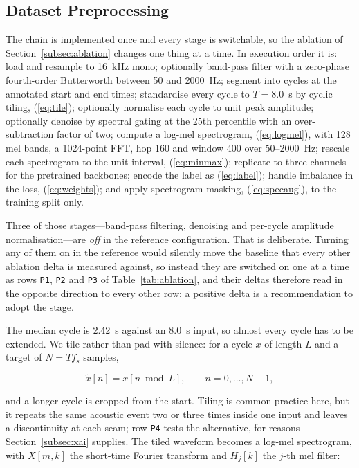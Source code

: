 \documentclass[journal,onecolumn]{IEEEtran}
\begin{document}
\subsection{Dataset Preprocessing}
\label{subsec:preprocessing}

The chain is implemented once and every stage is switchable, so the ablation of
Section~\ref{subsec:ablation} changes one thing at a time. In execution order it is: load and
resample to 16~kHz mono; optionally band-pass filter with a zero-phase fourth-order Butterworth
between 50 and 2000~Hz; segment into cycles at the annotated start and end times; standardise
every cycle to $T = 8.0$~s by cyclic tiling, (\ref{eq:tile}); optionally normalise each cycle
to unit peak amplitude; optionally denoise by spectral gating at the 25th percentile with an
over-subtraction factor of two; compute a log-mel spectrogram, (\ref{eq:logmel}), with 128 mel
bands, a 1024-point FFT, hop 160 and window 400 over 50--2000~Hz; rescale each spectrogram to
the unit interval, (\ref{eq:minmax}); replicate to three channels for the pretrained backbones;
encode the label as (\ref{eq:label}); handle imbalance in the loss, (\ref{eq:weights}); and
apply spectrogram masking, (\ref{eq:specaug}), to the training split only.

Three of those stages---band-pass filtering, denoising and per-cycle amplitude
normalisation---are \emph{off} in the reference configuration. That is deliberate. Turning
any of them on in the reference would silently move the baseline that every other ablation
delta is measured against, so instead they are switched on one at a time as rows
\texttt{P1}, \texttt{P2} and \texttt{P3} of Table~\ref{tab:ablation}, and their deltas
therefore read in the opposite direction to every other row: a positive delta is a
recommendation to adopt the stage.

The median cycle is 2.42~s against an 8.0~s input, so almost every cycle has to be extended.
We tile rather than pad with silence: for a cycle $x$ of length $L$ and a target of
$N = T f_s$ samples,

\begin{equation}
\tilde{x}[n] = x[n \bmod L], \qquad n = 0,\dots,N-1,
\label{eq:tile}
\end{equation}

and a longer cycle is cropped from the start. Tiling is common practice here, but it repeats
the same acoustic event two or three times inside one input and leaves a discontinuity at each
seam; row \texttt{P4} tests the alternative, for reasons Section~\ref{subsec:xai} supplies.
The tiled waveform becomes a log-mel spectrogram, with $X[m,k]$ the short-time Fourier
transform and $H_j[k]$ the $j$-th mel filter:
\end{document}
